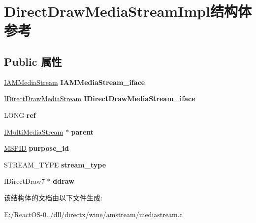\hypertarget{struct_direct_draw_media_stream_impl}{}\section{Direct\+Draw\+Media\+Stream\+Impl结构体 参考}
\label{struct_direct_draw_media_stream_impl}
\subsection*{Public 属性}
\begin{DoxyCompactItemize}
\item 
\mbox{\label{struct_direct_draw_media_stream_impl_a6aabeec2bb7dbc194bb98e1d6fef63e1}} 
\hyperlink{interface_i_a_m_media_stream}{I\+A\+M\+Media\+Stream} {\bfseries I\+A\+M\+Media\+Stream\+\_\+iface}
\item 
\mbox{\label{struct_direct_draw_media_stream_impl_a39fbf4298db7e408910118fbfe799966}} 
\hyperlink{interface_i_direct_draw_media_stream}{I\+Direct\+Draw\+Media\+Stream} {\bfseries I\+Direct\+Draw\+Media\+Stream\+\_\+iface}
\item 
\mbox{\label{struct_direct_draw_media_stream_impl_aa5503284b569870d7d21a48c5491dbd1}} 
L\+O\+NG {\bfseries ref}
\item 
\mbox{\label{struct_direct_draw_media_stream_impl_ac9a2de5ae3a6ca7435a86f8300f113a8}} 
\hyperlink{interface_i_multi_media_stream}{I\+Multi\+Media\+Stream} $\ast$ {\bfseries parent}
\item 
\mbox{\label{struct_direct_draw_media_stream_impl_a1e2e664f521f3e3a2a3e64d0bcea3357}} 
\hyperlink{interface_g_u_i_d}{M\+S\+P\+ID} {\bfseries purpose\+\_\+id}
\item 
\mbox{\label{struct_direct_draw_media_stream_impl_a930237462238e65ea55d1d1e618a10cb}} 
S\+T\+R\+E\+A\+M\+\_\+\+T\+Y\+PE {\bfseries stream\+\_\+type}
\item 
\mbox{\label{struct_direct_draw_media_stream_impl_aae3ab5bb5f42a58188a2d14bc110a443}} 
I\+Direct\+Draw7 $\ast$ {\bfseries ddraw}
\end{DoxyCompactItemize}


该结构体的文档由以下文件生成\+:\begin{DoxyCompactItemize}
\item 
E\+:/\+React\+O\+S-\/0../dll/directx/wine/amstream/mediastream.\+c\end{DoxyCompactItemize}
